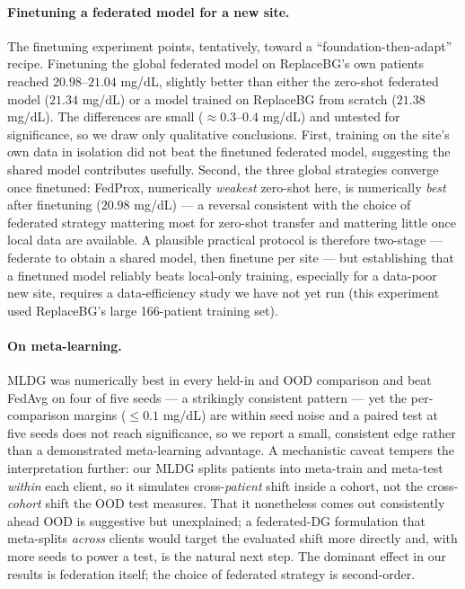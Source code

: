 \documentclass[10pt,letterpaper]{article}
\begin{document}
\paragraph{Finetuning a federated model for a new site.} The finetuning
experiment points, tentatively, toward a ``foundation-then-adapt'' recipe.
Finetuning the global federated model on ReplaceBG's own patients reached
$20.98$--$21.04$ mg/dL, slightly better than either the zero-shot federated model
($21.34$ mg/dL) or a model trained on ReplaceBG from scratch ($21.38$ mg/dL). The
differences are small ($\approx 0.3$--$0.4$ mg/dL) and untested for significance,
so we draw only qualitative conclusions. First, training on the site's own data
in isolation did not beat the finetuned federated model, suggesting the shared
model contributes usefully. Second, the three global strategies converge once
finetuned: FedProx, numerically \emph{weakest} zero-shot here, is numerically
\emph{best} after finetuning ($20.98$ mg/dL) --- a reversal consistent with the
choice of federated strategy mattering most for zero-shot transfer and mattering
little once local data are available. A
plausible practical protocol is therefore two-stage --- federate to obtain a
shared model, then finetune per site --- but establishing that a finetuned model
reliably beats local-only training, especially for a data-poor new site, requires
a data-efficiency study we have not yet run (this experiment used ReplaceBG's
large 166-patient training set).

\paragraph{On meta-learning.} MLDG was numerically best in every held-in and OOD
comparison and beat FedAvg on four of five seeds --- a strikingly consistent
pattern --- yet the per-comparison margins ($\le 0.1$ mg/dL) are within seed
noise and a paired test at five seeds does not reach significance, so we report a
small, consistent edge rather than a demonstrated meta-learning advantage. A
mechanistic caveat tempers the interpretation further: our MLDG splits patients
into meta-train and meta-test \emph{within} each client, so it simulates
cross-\emph{patient} shift inside a cohort, not the cross-\emph{cohort} shift the
OOD test measures. That it nonetheless comes out consistently ahead OOD is
suggestive but unexplained; a federated-DG formulation that meta-splits
\emph{across} clients would target the evaluated shift more directly and, with
more seeds to power a test, is the natural next step. The dominant effect in our
results is federation itself; the choice of federated strategy is second-order.
\end{document}

